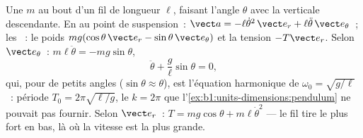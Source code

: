 \begin{example}\label{ex:b1:newton-dynamics:pendulum}
Une  $m$ au bout d'un fil de longueur $\ell$, faisant l'angle
$\theta$ avec la verticale descendante. En  au point
de suspension~: $\vect a =
-\ell\dot\theta^2\,\vect e_r + \ell\ddot\theta\,\vect e_\theta$~; les
~: le poids $mg(\cos\theta\,\vect e_r - \sin\theta\,\vect e_\theta)$
et la tension $-T\vect e_r$. Selon $\vect e_\theta$~: $m\ell\ddot\theta =
-mg\sin\theta$,
\[
\ddot\theta + \frac{g}{\ell}\sin\theta = 0 ,
\]
qui, pour de petits angles ($\sin\theta \approx \theta$), est l'équation
harmonique de  $\omega_0 = \sqrt{g/\ell}$~: période
$T_0 = 2\pi\sqrt{\ell/g}$, le $k = 2\pi$ que
l'\cref{ex:b1:units-dimensions:pendulum} ne pouvait pas fournir. Selon
$\vect e_r$~: $T = mg\cos\theta + m\ell\dot\theta^2$ --- le fil tire le
plus fort en bas, là où la vitesse est la plus grande.
\end{example}

